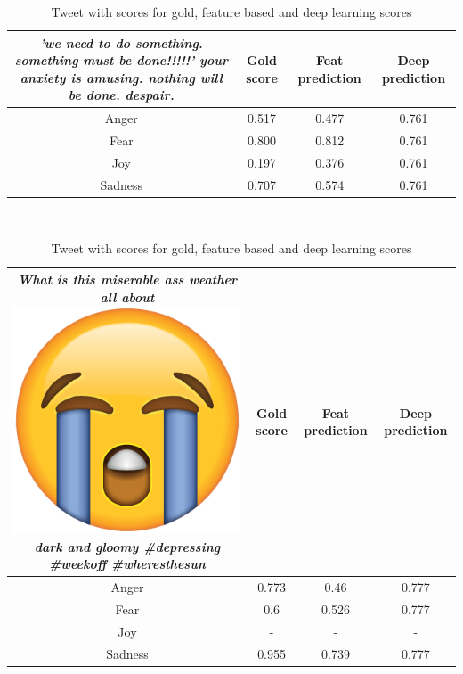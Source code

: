 \begin{table}[H]
\begin{tabular}{c|c|c|c|}
\parbox[t]{6cm}{\textit{'we need to do something. something must be done!!!!!' your anxiety is amusing. nothing will be done. despair.}} & Gold score & Feat prediction & Deep prediction \\ \hline
Anger & 0.517 & 0.477 & 0.761\\ \hline
Fear & 0.800 & 0.812 & 0.761\\ \hline
Joy & 0.197 & 0.376 & 0.761\\ \hline
Sadness & 0.707 & 0.574 & 0.761
\end{tabular}
\\[2ex]
\begin{tabular}{c|c|c|c|}
\parbox[t]{6cm}{\textit{What is this miserable ass weather all about \includegraphics[scale=0.015]{pictures/loudly_crying_face_emoji.png} dark and gloomy \#depressing \#weekoff \#wheresthesun}} & Gold score & Feat prediction & Deep prediction \\ \hline
Anger & 0.773 & 0.46 & 0.777\\ \hline
Fear & 0.6 & 0.526 & 0.777 \\ \hline
Joy & - & - & - \\ \hline
Sadness & 0.955 & 0.739 & 0.777
\end{tabular}
\caption{Tweet with scores for gold, feature based and deep learning scores}
\label{tab:predcomp}
\end{table}
